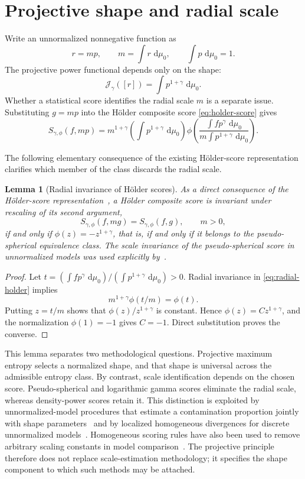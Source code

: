 \documentclass[pdflatex,sn-mathphys-num]{sn-jnl}
\theoremstyle{thmstyleone}
\newtheorem{lemma}{Lemma}
\theoremstyle{thmstyletwo}
\theoremstyle{thmstylethree}
\newcommand{\dd}{\,\mathrm{d}}
\newcommand{\calJ}{\mathcal{J}}
\begin{document}
\section{Projective shape and radial scale}\label{sec:shape-scale}

Write an unnormalized nonnegative function as
\[
 r=mp,
 \qquad
 m=\int r\,\dd\mu_0,
 \qquad
 \int p\,\dd\mu_0=1.
\]
The projective power functional depends only on the shape:
\[
 \calJ_\gamma([r])=\int p^{1+\gamma}\,\dd\mu_0.
\]
Whether a statistical score identifies the radial scale $m$ is a separate issue. Substituting $g=mp$ into the H\"older composite score \cref{eq:holder-score} gives
\begin{equation}
 S_{\gamma,\phi}(f,mp)
 =
 m^{1+\gamma}\left(\int p^{1+\gamma}\,\dd\mu_0\right)
 \phi\!\left(
 \frac{\int fp^\gamma\,\dd\mu_0}
 {m\int p^{1+\gamma}\,\dd\mu_0}
 \right).
\label{eq:radial-holder}
\end{equation}

The following elementary consequence of the existing Hölder-score representation clarifies which member of the class discards the radial scale.
\begin{lemma}[Radial invariance of H\"older scores]
\label{lem:radial}
As a direct consequence of the H\"older-score representation~\citep{KanamoriFujisawa2014Bernoulli}, a H\"older composite score is
invariant under rescaling of its second argument,
\[
S_{\gamma,\phi}(f,mg)=S_{\gamma,\phi}(f,g),
\qquad m>0,
\]
if and only if $\phi(z)=-z^{1+\gamma}$, that is, if and only if it
belongs to the pseudo-spherical equivalence class. The scale
invariance of the pseudo-spherical score in unnormalized models was
used explicitly by~\citet{KanamoriFujisawa2015}.
\end{lemma}

\begin{proof}
Let $t=(\int fp^\gamma\,\dd\mu_0)/(\int p^{1+\gamma}\,\dd\mu_0)>0$. Radial invariance in \cref{eq:radial-holder} implies
\[
 m^{1+\gamma}\phi(t/m)=\phi(t).
\]
Putting $z=t/m$ shows that $\phi(z)/z^{1+\gamma}$ is constant. Hence $\phi(z)=Cz^{1+\gamma}$, and the normalization $\phi(1)=-1$ gives $C=-1$. Direct substitution proves the converse.
\end{proof}

This lemma separates two methodological questions. Projective maximum entropy selects a normalized shape, and that shape is universal across the admissible entropy class. By contrast, scale identification depends on the chosen score. Pseudo-spherical and logarithmic gamma scores eliminate the radial scale, whereas density-power scores retain it. This distinction is exploited by unnormalized-model procedures that estimate a contamination proportion jointly with shape parameters~\citep{KanamoriFujisawa2015} and by localized homogeneous divergences for discrete unnormalized models~\citep{TakenouchiKanamori2017}. Homogeneous scoring rules have also been used to remove arbitrary scaling constants in model comparison~\citep{DawidMusio2015}. The projective principle therefore does not replace scale-estimation methodology; it specifies the shape component to which such methods may be attached.
\end{document}
